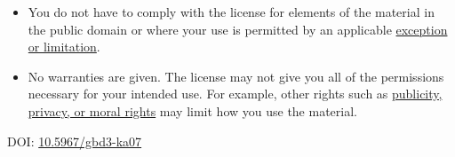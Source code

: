 \begin{flushleft}
\begin{itemize}
\tightlist
\item
  You do not have to comply with the license for elements of the material in the public domain or where your use is permitted by an applicable
  \href{https://creativecommons.org/licenses/by/4.0/\#ref-exception-or-limitation}{exception or limitation}.\\
\item
  No warranties are given. The license may not give you all of the permissions necessary for your intended use. For example, other rights such as
  \href{https://creativecommons.org/licenses/by/4.0/\#ref-publicity-privacy-or-moral-rights}{publicity, privacy, or moral rights} may limit how you use the material.
\end{itemize}

\vspace{5mm}
DOI: \href{https://doi.org/10.5967/gbd3-ka07}{10.5967/gbd3-ka07}
\end{flushleft}
